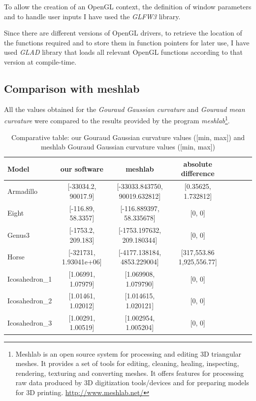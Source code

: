 To allow the creation of an OpenGL context, the definition of window parameters and to handle user inputs I have used the \textit{GLFW3} library.

Since there are different versions of OpenGL drivers, to retrieve the location of the functions required and to store them in function pointers for later use, I have used \textit{GLAD} library that loads all relevant OpenGL functions according to that version at compile-time.

\subsection{Comparison with meshlab}
All the values obtained for the \textit{Gouraud Gaussian curvature} and \textit{Gouraud mean curvature} were compared to the results provided by the program \textit{meshlab}\footnote{Meshlab is an open source system for processing and editing 3D triangular meshes.
It provides a set of tools for editing, cleaning, healing, inspecting, rendering, texturing and converting meshes. It offers features for processing raw data produced by 3D digitization tools/devices and for preparing models for 3D printing. \url{http://www.meshlab.net/}}.


\begin{table}[!h]%
    \centering
\begin{tabular}{l*{6}{c}r}
    \centering
    Model              & our software &  meshlab   & absolute difference\\
    \hline
    Armadillo          & [-33034.2, 90017.9] & [-33033.843750, 90019.632812] & [0.35625, 1.732812] \\
    Eight              & [-116.89, 58.3357] & [-116.889397, 58.335678] & [0, 0] \\
    Genus3             & [-1753.2, 209.183] & [-1753.197632, 209.180344] & [0, 0]  \\
    Horse              & [-321731, 1.93041e+06] &  [-4177.138184, 4853.229004] & [317,553.86 1,925,556.77]\\
    Icosahedron\_1      &  [1.06991, 1.07979] & [1.069908, 1.079790] & [0, 0] \\
    Icosahedron\_2      &  [1.01461, 1.02012] & [1.014615, 1.020121] & [0, 0] \\
    Icosahedron\_3      & [1.00291, 1.00519] &  [1.002954, 1.005204] & [0, 0]
\end{tabular}
\caption{Comparative table: our Gouraud Gaussian curvature values ([min, max]) and meshlab Gouraud Gaussian curvature values ([min, max])}
\label{table:table-gaussian-meshlab}
\end{table}



